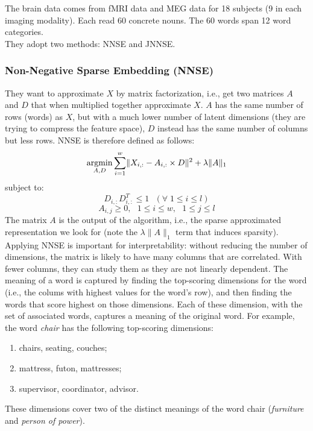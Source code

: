 The brain data comes from fMRI data and MEG data for 18 subjects (9 in each imaging modality). Each read 60 concrete nouns. The 60 words span 12 word categories.\\

They adopt two methods: NNSE and JNNSE.

\subsubsection{Non-Negative Sparse Embedding (NNSE)}
They want to approximate $X$ by matrix factorization, i.e., get two matrices $A$ and $D$ that when multiplied together approximate $X$. $A$ has the same number of rows (words) as $X$, but with a much lower number of latent dimensions (they are trying to compress the feature space), $D$ instead has the same number of columns but less rows. NNSE is therefore defined as follows:
\[
\operatorname*{argmin}_{A,D} \sum_{i=1}^w \lVert X_{i,:} - A_{i,:} \times D \rVert^2 + \lambda \lVert A\rVert_1
\]
subject to:
\[
D_{i,:}D_{i,:}^T \leq 1 \:\:\:(\forall \;1 \leq i \leq l)
\]
\[
A_{i,j} \geq 0,\:\:\: 1 \leq i \leq w,\:\:\: 1 \leq j \leq l
\]
The matrix $A$ is the output of the algorithm, i.e., the sparse approximated representation we look for (note the $\lambda \lVert A\rVert_1$ term that induces sparsity).\\

Applying NNSE is important for interpretability: without reducing the number of dimensions, the matrix is likely to have many columns that are correlated. With fewer columns, they can study them as they are not linearly dependent.
The meaning of a word is captured by finding the top-scoring dimensions for the word (i.e., the colums with highest values for the word’s row), and then finding the words that score highest on those dimensions. Each of these dimension, with the set of associated words, captures a meaning of the original word. For example, the word \textit{chair} has the following top-scoring dimensions: 
\begin{enumerate}
    \item chairs, seating, couches;
    \item mattress, futon, mattresses;
    \item supervisor, coordinator, advisor.
\end{enumerate}
These dimensions cover two of the distinct meanings of the word chair (\textit{furniture} and \textit{person of power}).

